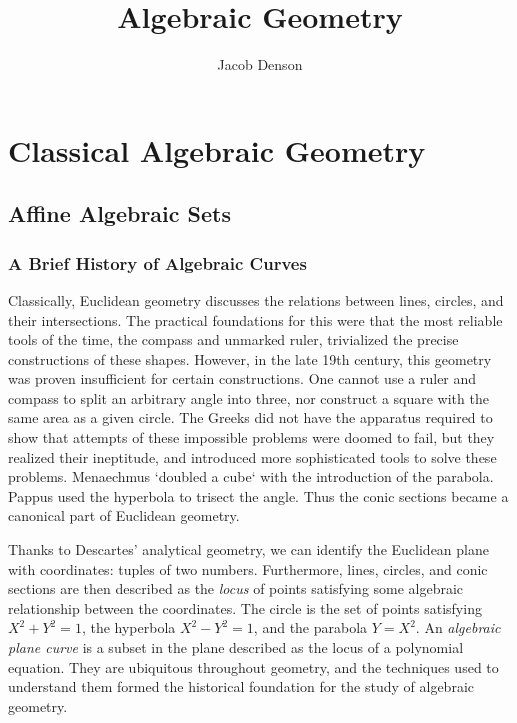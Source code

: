 

\title{Algebraic Geometry}
\author{Jacob Denson}



\maketitle
\tableofcontents
{}

\part{Classical Algebraic Geometry}

\chapter{Affine Algebraic Sets}

\section{A Brief History of Algebraic Curves}

Classically, Euclidean geometry discusses the relations between lines, circles, and their intersections. The practical foundations for this were that the most reliable tools of the time, the compass and unmarked ruler, trivialized the precise constructions of these shapes. However, in the late 19th century, this geometry was proven insufficient for certain constructions. One cannot use a ruler and compass to split an arbitrary angle into three, nor construct a square with the same area as a given circle. The Greeks did not have the apparatus required to show that attempts of these impossible problems were doomed to fail, but they realized their ineptitude, and introduced more sophisticated tools to solve these problems. Menaechmus `doubled a cube` with the introduction of the parabola. Pappus used the hyperbola to trisect the angle. Thus the conic sections became a canonical part of Euclidean geometry.

Thanks to Descartes' analytical geometry, we can identify the Euclidean plane with coordinates: tuples of two numbers. Furthermore, lines, circles, and conic sections are then described as the {\it locus} of points satisfying some algebraic relationship between the coordinates. The circle is the set of points satisfying $X^2 + Y^2 = 1$, the hyperbola $X^2 - Y^2 = 1$, and the parabola $Y = X^2$. An \emph{algebraic plane curve} is a subset in the plane described as the locus of a polynomial equation. They are ubiquitous throughout geometry, and the techniques used to understand them formed the historical foundation for the study of algebraic geometry.

